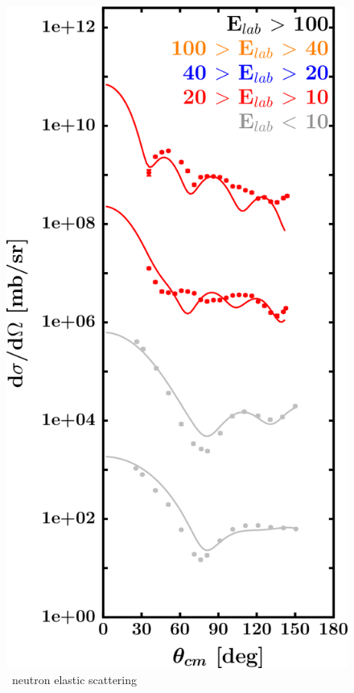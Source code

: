 \begin{figure}[hbtp]
\begin{minipage}{0.47\textwidth}
        \includegraphics[width=\textwidth]{figures/ca48_neutronElastic.png}
        \caption*{\caEight\ neutron elastic scattering}
        \label{DOMFitData_ca48_neutron_elastic}
    \end{minipage}
\end{figure}
\vspace{0.70in}
